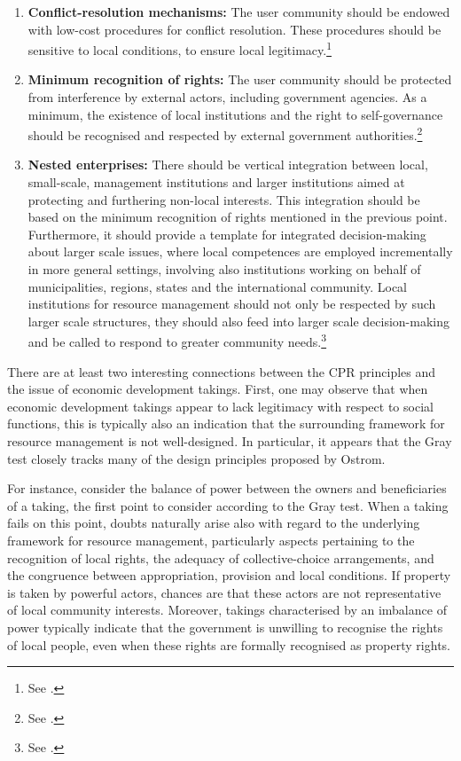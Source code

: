 \begin{enumerate}
\item {\bf Conflict-resolution mechanisms:} The user community should be endowed with low-cost procedures for conflict resolution. These procedures should be sensitive to local conditions, to ensure local legitimacy.\footnote{See \cite[100-101]{ostrom90}.}
\item {\bf Minimum recognition of rights:} The user community should be protected from interference by external actors, including government agencies. As a minimum, the existence of local institutions and the right to self-governance should be recognised and respected by external government authorities.\footnote{See \cite[101]{ostrom90}.}
\item {\bf Nested enterprises:} There should be vertical integration between local, small-scale, management institutions and larger institutions aimed at protecting and furthering non-local interests. This integration should be based on the minimum recognition of rights mentioned in the previous point. Furthermore, it should provide a template for integrated decision-making about larger scale issues, where local competences are employed incrementally in more general settings, involving also institutions working on behalf of municipalities, regions, states and the international community. Local institutions for resource management should not only be respected by such larger scale structures, they should also feed into larger scale decision-making and be called to respond to greater community needs.\footnote{See \cite[101-102]{ostrom90}.}
\end{enumerate}

There are at least two interesting connections between the CPR principles and the issue of economic development takings. First, one may observe that when economic development takings appear to lack legitimacy with respect to social functions, this is typically also an indication that the surrounding framework for resource management is not well-designed. In particular, it appears that the Gray test closely tracks many of the design principles proposed by Ostrom.

For instance, consider the balance of power between the owners and beneficiaries of a taking, the first point to consider according to the Gray test. When a taking fails on this point, doubts naturally arise also with regard to the underlying framework for resource management, particularly aspects pertaining to the recognition of local rights, the adequacy of collective-choice arrangements, and the congruence between appropriation, provision and local conditions. If property is taken by powerful actors, chances are that these actors are not representative of local community interests. Moreover, takings characterised by an imbalance of power typically indicate that the government is unwilling to recognise the rights of local people, even when these rights are formally recognised as property rights.

